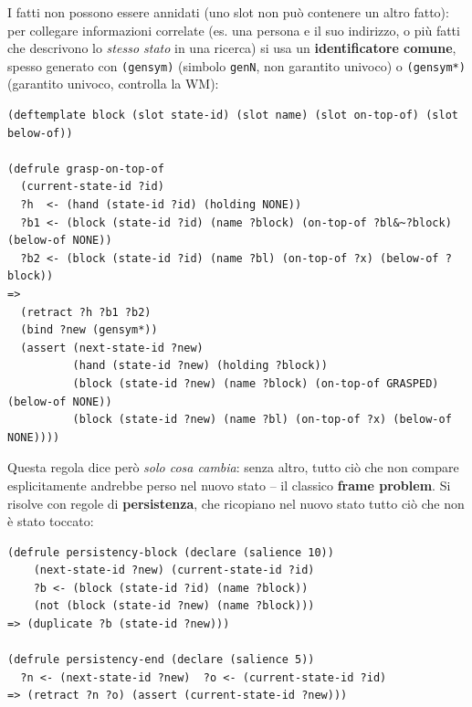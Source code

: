 \documentclass[a4paper,11pt]{article}
\begin{document}
I fatti non possono essere annidati (uno slot non può contenere un altro fatto): per collegare informazioni correlate (es. una persona e il suo indirizzo, o più fatti che descrivono lo \emph{stesso stato} in una ricerca) si usa un \textbf{identificatore comune}, spesso generato con \texttt{(gensym)} (simbolo \texttt{genN}, non garantito univoco) o \texttt{(gensym*)} (garantito univoco, controlla la WM):
\begin{lstlisting}
(deftemplate block (slot state-id) (slot name) (slot on-top-of) (slot below-of))

(defrule grasp-on-top-of
  (current-state-id ?id)
  ?h  <- (hand (state-id ?id) (holding NONE))
  ?b1 <- (block (state-id ?id) (name ?block) (on-top-of ?bl&~?block) (below-of NONE))
  ?b2 <- (block (state-id ?id) (name ?bl) (on-top-of ?x) (below-of ?block))
=>
  (retract ?h ?b1 ?b2)
  (bind ?new (gensym*))
  (assert (next-state-id ?new)
          (hand (state-id ?new) (holding ?block))
          (block (state-id ?new) (name ?block) (on-top-of GRASPED) (below-of NONE))
          (block (state-id ?new) (name ?bl) (on-top-of ?x) (below-of NONE))))
\end{lstlisting}
Questa regola dice però \emph{solo cosa cambia}: senza altro, tutto ciò che non compare esplicitamente andrebbe perso nel nuovo stato -- il classico \textbf{frame problem}. Si risolve con regole di \textbf{persistenza}, che ricopiano nel nuovo stato tutto ciò che non è stato toccato:
\begin{lstlisting}
(defrule persistency-block (declare (salience 10))
    (next-state-id ?new) (current-state-id ?id)
    ?b <- (block (state-id ?id) (name ?block))
    (not (block (state-id ?new) (name ?block)))
=> (duplicate ?b (state-id ?new)))

(defrule persistency-end (declare (salience 5))
  ?n <- (next-state-id ?new)  ?o <- (current-state-id ?id)
=> (retract ?n ?o) (assert (current-state-id ?new)))
\end{lstlisting}
\end{document}
